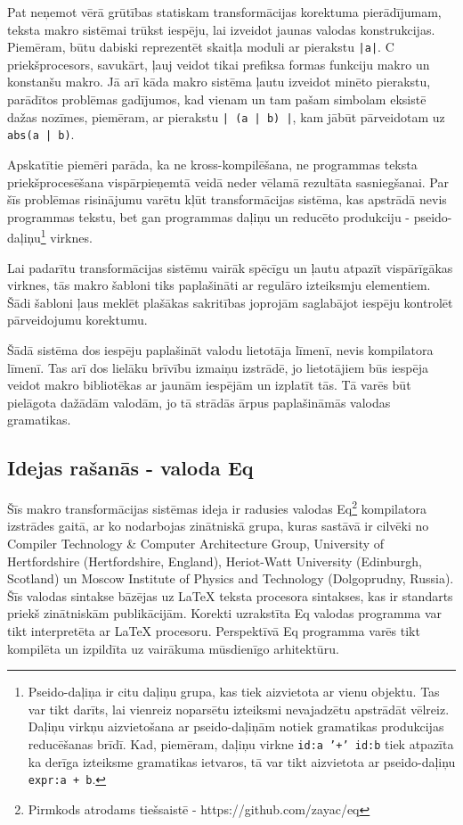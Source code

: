Pat neņemot vērā grūtības statiskam transformācijas korektuma pierādījumam, teksta makro sistēmai trūkst iespēju, lai izveidot jaunas valodas konstrukcijas. Piemēram, būtu dabiski reprezentēt skaitļa moduli ar pierakstu \verb/|a|/. C priekšprocesors, savukārt, ļauj veidot tikai prefiksa formas funkciju makro un konstanšu makro. Jā arī kāda makro sistēma ļautu izveidot minēto pierakstu, parādītos problēmas gadījumos, kad vienam un tam pašam simbolam eksistē dažas nozīmes, piemēram, ar pierakstu \verb/| (a | b) |/, kam jābūt pārveidotam uz \verb/abs(a | b)/.

Apskatītie piemēri parāda, ka ne kross-kompilēšana, ne programmas teksta priekšprocesēšana vispārpieņemtā veidā neder vēlamā rezultāta sasniegšanai. Par šīs problēmas risinājumu varētu kļūt transformācijas sistēma, kas apstrādā nevis programmas tekstu, bet gan programmas daļiņu un reducēto produkciju - pseido-daļiņu\footnote{Pseido-daļiņa ir citu daļiņu grupa, kas tiek aizvietota ar vienu objektu. Tas var tikt darīts, lai vienreiz noparsētu izteiksmi nevajadzētu apstrādāt vēlreiz. Daļiņu virkņu aizvietošana ar pseido-daļiņām notiek gramatikas produkcijas reducēšanas brīdī. Kad, piemēram, daļiņu virkne \texttt{{id:a} '+' {id:b}} tiek atpazīta ka derīga izteiksme gramatikas ietvaros, tā var tikt aizvietota ar pseido-daļiņu \texttt{{expr:a + b}}.} virknes. 

Lai padarītu transformācijas sistēmu vairāk spēcīgu un ļautu atpazīt vispārīgākas virknes, tās makro šabloni tiks paplašināti ar regulāro izteiksmju elementiem. Šādi šabloni ļaus meklēt plašākas sakritības joprojām saglabājot iespēju kontrolēt pārveidojumu korektumu.

Šādā sistēma dos iespēju paplašināt valodu lietotāja līmenī, nevis kompilatora līmenī. Tas arī dos lielāku brīvību izmaiņu izstrādē, jo lietotājiem būs iespēja veidot makro bibliotēkas ar jaunām iespējām un izplatīt tās. Tā varēs būt pielāgota dažādām valodām, jo tā strādās ārpus paplašināmās valodas gramatikas.

\subsection{Idejas rašanās - valoda Eq}
Šīs makro transformācijas sistēmas ideja ir radusies valodas Eq\footnote{Pirmkods atrodams tiešsaistē - https://github.com/zayac/eq} kompilatora izstrādes gaitā, ar ko nodarbojas zinātniskā grupa, kuras sastāvā ir cilvēki no Compiler Technology \& Computer Architecture Group, University of Hertfordshire (Hertfordshire, England), Heriot-Watt University (Edinburgh, Scotland) un Moscow Institute of Physics and Technology (Dolgoprudny, Russia). Šīs valodas sintakse bāzējas uz \LaTeX{} teksta procesora sintakses, kas ir standarts priekš zinātniskām publikācijām. Korekti uzrakstīta Eq valodas programma var tikt interpretēta ar \LaTeX{} procesoru. Perspektīvā Eq programma varēs tikt kompilēta un izpildīta uz vairākuma mūsdienīgo arhitektūru. 

